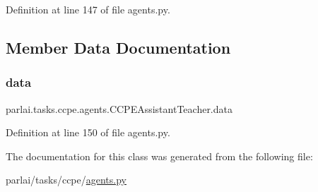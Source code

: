 Definition at line 147 of file agents.\+py.



\subsection{Member Data Documentation}
\mbox{\label{classparlai_1_1tasks_1_1ccpe_1_1agents_1_1CCPEAssistantTeacher_aeb95d397c64b27bdd7d99270a86ca190}} 
\subsubsection{\texorpdfstring{data}{data}}
{\footnotesize\ttfamily parlai.\+tasks.\+ccpe.\+agents.\+C\+C\+P\+E\+Assistant\+Teacher.\+data}



Definition at line 150 of file agents.\+py.



The documentation for this class was generated from the following file\+:\begin{DoxyCompactItemize}
\item 
parlai/tasks/ccpe/\hyperlink{parlai_2tasks_2ccpe_2agents_8py}{agents.\+py}\end{DoxyCompactItemize}
